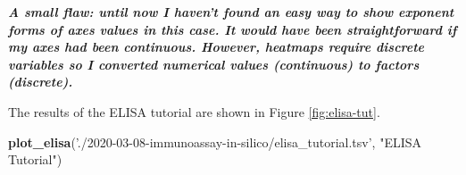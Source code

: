 \documentclass[
]{article}
\newenvironment{Shaded}{\begin{snugshade}}{\end{snugshade}}
\newcommand{\ControlFlowTok}[1]{\textcolor[rgb]{0.13,0.29,0.53}{\textbf{#1}}}
\newcommand{\DataTypeTok}[1]{\textcolor[rgb]{0.13,0.29,0.53}{#1}}
\newcommand{\KeywordTok}[1]{\textcolor[rgb]{0.13,0.29,0.53}{\textbf{#1}}}
\newcommand{\NormalTok}[1]{#1}
\newcommand{\OperatorTok}[1]{\textcolor[rgb]{0.81,0.36,0.00}{\textbf{#1}}}
\newcommand{\StringTok}[1]{\textcolor[rgb]{0.31,0.60,0.02}{#1}}
\begin{document}
\begin{Shaded}
\end{Shaded}

\textbf{\emph{A small flaw: until now I haven't found an easy way to show exponent forms of axes values in this case. It would have been straightforward if my axes had been continuous. However, heatmaps require discrete variables so I converted numerical values (continuous) to factors (discrete).}}

The results of the ELISA tutorial are shown in Figure \ref{fig:elisa-tut}.

\begin{Shaded}
\begin{Highlighting}[]
\KeywordTok{plot_elisa}\NormalTok{(}\StringTok{'./2020-03-08-immunoassay-in-silico/elisa_tutorial.tsv'}\NormalTok{, }\StringTok{"ELISA Tutorial"}\NormalTok{)}
\end{Highlighting}
\end{Shaded}
\end{document}
